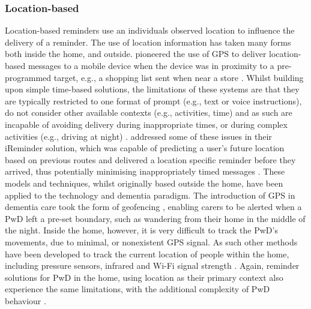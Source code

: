 \subsubsection{Location-based}
Location-based reminders use an individuals observed location to influence the delivery of a reminder. The use of location information has taken many forms both inside the home, and outside. \citeauthor{Marmasse2000} pioneered the use of GPS to deliver location-based messages to a mobile device when the device was in proximity to a pre-programmed target, e.g., a shopping list sent when near a store \cite{Marmasse2000}.
Whilst building upon simple time-based solutions, the limitations of these systems are that they are typically restricted to one format of prompt (e.g., text or voice instructions), do not consider other available contexts (e.g., activities, time) and as such are incapable of avoiding delivery during inappropriate times, or during complex activities (e.g., driving at night) \cite{Seelye2012}. \citeauthor{Tu2013} addressed some of these issues in their iReminder solution, which was capable of predicting a user’s future location based on previous routes and delivered a location specific reminder before they arrived, thus potentially minimising inappropriately timed messages \cite{Tu2013}. These models and techniques, whilst originally based outside the home, have been applied to the technology and dementia paradigm. The introduction of GPS in dementia care took the form of geofencing \cite{Wang2015}, enabling carers to be alerted when a PwD left a pre-set boundary, such as wandering from their home in the middle of the night. Inside the home, however, it is very difficult to track the PwD's movements, due to minimal, or nonexistent GPS signal. As such other methods have been developed to track the current location of people within the home, including pressure sensors, infrared and Wi-Fi signal strength \cite{Chen2012}. Again, reminder solutions for PwD in the home, using location as their primary context also experience the same limitations, with the additional complexity of PwD behaviour \cite{Grunerbl2011,Lin2014a}.

